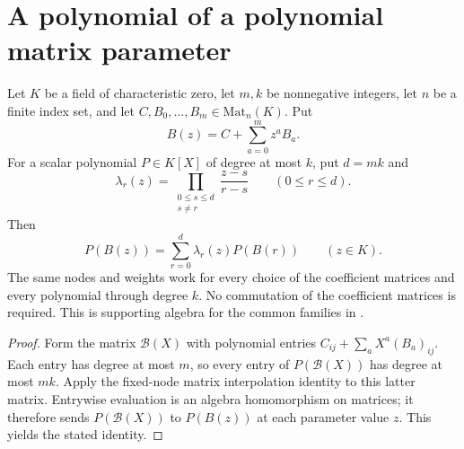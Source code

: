 \section{A polynomial of a polynomial matrix parameter}

\begin{lemma}
    \label{lem:matrix_polynomial_parameter}
    \leanok
    Let $K$ be a field of characteristic zero, let $m,k$ be nonnegative
    integers, let $n$ be a finite index set, and let $C,B_0,\ldots,B_m\in\mathrm{Mat}_n(K)$. Put
    \[
        B(z)=C+\sum_{a=0}^m z^a B_a.
    \]
    For a scalar polynomial $P\in K[X]$ of degree at most $k$, put
    $d=mk$ and
    \[
        \lambda_r(z)=\prod_{\substack{0\le s\le d\\s\ne r}}
        \frac{z-s}{r-s}\qquad(0\le r\le d).
    \]
    Then
    \[
        P(B(z))=\sum_{r=0}^d\lambda_r(z)P(B(r))
        \qquad(z\in K).
    \]
    The same nodes and weights work for every choice of the coefficient
    matrices and every polynomial through degree $k$. No commutation of
    the coefficient matrices is required. This is supporting algebra for
    the common families in \cite[Proposition~5.7]{Arad2016RigorousRG}.
\end{lemma}
\begin{proof}\leanok
    Form the matrix $\mathcal B(X)$ with polynomial entries
    $C_{ij}+\sum_a X^a(B_a)_{ij}$. Each entry has degree at most $m$,
    so every entry of $P(\mathcal B(X))$ has degree at most $mk$.
    Apply the fixed-node matrix interpolation identity to this latter
    matrix. Entrywise evaluation is an algebra homomorphism on matrices;
    it therefore sends $P(\mathcal B(X))$ to $P(B(z))$ at each parameter
    value $z$. This yields the stated identity.
\end{proof}
